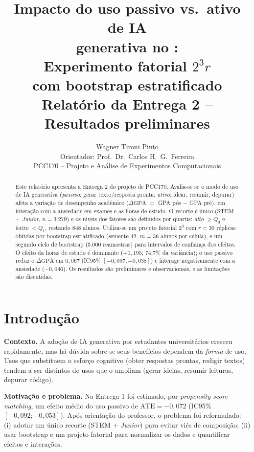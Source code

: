 \documentclass[12pt,a4paper]{article}
\title{\textbf{Impacto do uso passivo vs.\ ativo de IA\\generativa no \dgpa{}:\\Experimento fatorial $2^3 r$\\com bootstrap estratificado}\\[0.3em]
\large Relat\'orio da Entrega 2 -- Resultados preliminares}
\author{Wagner Tironi Pinto\\[0.2em]
\small Orientador: Prof.\ Dr.\ Carlos H.\ G.\ Ferreira\\
\small PCC170 -- Projeto e An\'alise de Experimentos Computacionais}
\date{}
\newcommand{\dgpa}{\ensuremath{\Delta\mathrm{GPA}}}
\begin{document}
\maketitle

\begin{abstract}
Este relat\'orio apresenta a Entrega 2 do projeto de PCC170. Avalia-se se o modo de uso de IA generativa
(\emph{passivo}: gerar texto/resposta pronta; \emph{ativo}: idear, resumir, depurar) afeta a varia\c{c}\~ao
de desempenho acad\^emico (\dgpa{} $=$ GPA p\'os $-$ GPA pr\'e), em interação com a ansiedade em exames e as horas de estudo.
O recorte \'e \'unico (STEM + \emph{Junior}, $n=3.279$) e os n\'iveis dos fatores s\'ao definidos por quartis:
\emph{alto} $\ge Q_3$ e \emph{baixo} $<Q_1$, restando 848 alunos. Utiliza-se um projeto fatorial $2^3$ com $r=30$ r\'eplicas
obtidas por bootstrap estratificado (semente 42, $m=36$ alunos por c\'elula), e um segundo ciclo de bootstrap (5.000 reamostras)
para intervalos de confian\c{c}a dos efeitos. O efeito da horas de estudo \'e dominante ($+0{,}195$; 74,7\% da vari\^ancia);
o uso passivo reduz o \dgpa{} em $0{,}067$ (IC95\% $[-0{,}097;-0{,}038]$) e interage negativamente com a ansiedade
($-0{,}046$). Os resultados s\~ao preliminares e observacionais, e as limita\c{c}\~oes s\~ao discutidas.
\end{abstract}

\tableofcontents
\newpage

\section{Introdu\c{c}\~ao}
\textbf{Contexto.} A ado\c{c}\~ao de IA generativa por estudantes universit\'arios cresceu rapidamente, mas h\'a
d\'uvida sobre se seus benef\'icios dependem da \emph{forma} de uso. Usos que substituem o esfor\c{c}o cognitivo
(obter respostas prontas, redigir textos) tendem a ser distintos de usos que o ampliam (gerar ideias, resumir leituras, depurar c\'odigo).

\textbf{Motiva\c{c}\~ao e problema.} Na Entrega 1 foi estimado, por \emph{propensity score matching}, um efeito m\'edio
do uso passivo de $\text{ATE}=-0{,}072$ (IC95\% $[-0{,}092;-0{,}053]$). Ap\'os orienta\c{c}\~ao do professor, o problema foi
reformulado: (i) adotar um \'unico recorte (STEM + \emph{Junior}) para evitar vi\'es de composi\c{c}\~ao; (ii) usar
bootstrap e um projeto fatorial para normalizar os dados e quantificar efeitos e intera\c{c}\~oes.
\end{document}
